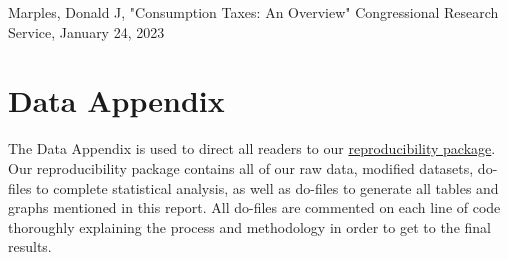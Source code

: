 \documentclass[12pt]{article}
\begin{document}
Marples, Donald J, "Consumption Taxes: An Overview" Congressional Research Service, January 24, 2023

\newpage
\section*{Data Appendix} \label{sec:appendixa}

The Data Appendix is used to direct all readers to our \href{https://github.com/ecn310/course-project-taxes-tariffs/blob/main/Reproducibility_Package/README.md}{reproducibility package}. Our reproducibility package contains all of our raw data, modified datasets, do-files to complete statistical analysis, as well as do-files to generate all tables and graphs mentioned in this report. All do-files are commented on each line of code thoroughly explaining the process and methodology in order to get to the final results. 
\end{document}
